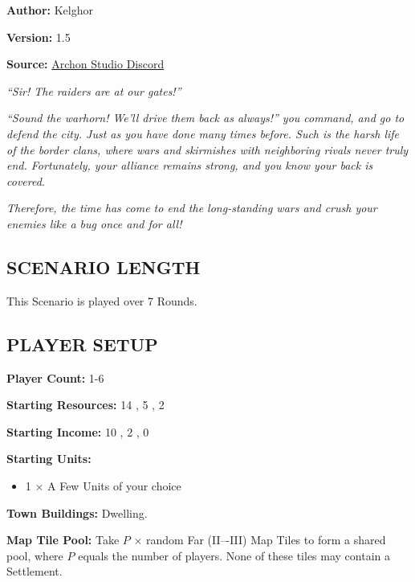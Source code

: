 
\begin{multicols}{2}

\textbf{Author:} Kelghor

\textbf{Version:} 1.5

\textbf{Source:} \href{https://discord.com/channels/740870068178649108/1313651865648369725}{Archon Studio Discord}

\textit{``Sir! The raiders are at our gates!''}

\textit{``Sound the warhorn! We'll drive them back as always!'' you command, and go to defend the city. Just as you have done many times before. Such is the harsh life of the border clans, where wars and skirmishes with neighboring rivals never truly end. Fortunately, your alliance remains strong, and you know your back is covered.}

\textit{Therefore, the time has come to end the long-standing wars and crush your enemies like a bug once and for all!}

\subsection*{\MakeUppercase{Scenario Length}}

This Scenario is played over 7 Rounds.

\subsection*{\MakeUppercase{Player Setup}}

\textbf{Player Count:} 1-6

\textbf{Starting Resources:} 14 , 5 , 2 

\textbf{Starting Income:} 10 , 2 , 0 

\textbf{Starting Units:}
\begin{itemize}
  \item  1 × A Few  Units of your choice
\end{itemize}

\textbf{Town Buildings:}  Dwelling.

\textbf{Map Tile Pool:} Take $P$ × random Far (II–-III) Map Tiles to form a shared pool, where $P$ equals the number of players. None of these tiles may contain a Settlement.


\end{multicols}
